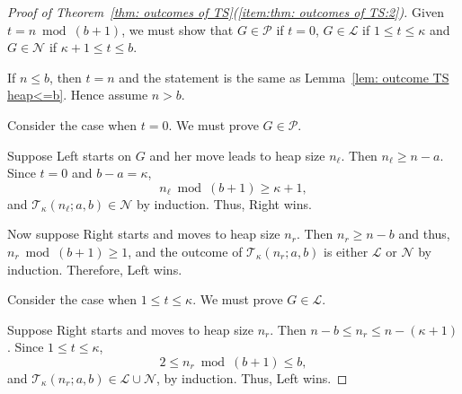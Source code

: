 \documentclass[oneside,reqno]{amsart}
\newcommand{\ts}{\mathcal{T}}
\newcommand{\lp}{\mathscr{L}}
\newcommand{\np}{\mathscr{N}}
\newcommand{\pp}{\mathscr{P}}
\begin{document}

\begin{proof}[Proof of Theorem~\ref{thm: outcomes of TS}(\ref{item:thm: outcomes of TS:2})]
    Given $t=n\bmod (b+1)$, we must show that $G\in \pp$ if $t=0$, $G\in \lp$ if $1\le t\le \kappa$ and $G\in \np$ if $\kappa+1\le t\le b$.

    If $n\le b$, then $t=n$ and the statement is the same as Lemma~\ref{lem: outcome TS heap<=b}. Hence assume $n>b$. 
    
    
    
    Consider the case when $t=0$. We must prove $G\in \pp$. 
    
    Suppose Left starts on $G$ and her move leads to heap size $n_\ell$. Then $n_\ell\ge n-a$. Since $t=0$ and $b-a={\kappa}$, $$ n_\ell \bmod (b+1) \ge {\kappa}+1,$$ and $\ts_{\kappa}(n_\ell;a,b)\in \np$ by induction. Thus, Right wins. 
    
    Now suppose Right starts and moves to heap size $n_r$. Then $ n_r\ge n-b$ and thus, $n_r \bmod (b+1)\ge 1$, and the outcome of $\ts_{\kappa}(n_r;a,b)$ is either $\lp$ or $\np$ by induction. Therefore, Left wins. 

    Consider the case when $1\le t\le {\kappa}$. We must prove $G\in\lp$. 
    
    Suppose Right starts and moves to heap size $n_r$. Then $n-b\le n_r\le n-({\kappa}+1)$. Since $1\le t\le {\kappa}$, $$2\le n_r \bmod (b+1)\le b,$$ and $\ts_{\kappa}(n_r;a,b)\in \lp\cup\np$, by induction. Thus, Left wins. 
    

\end{proof}
\end{document}

